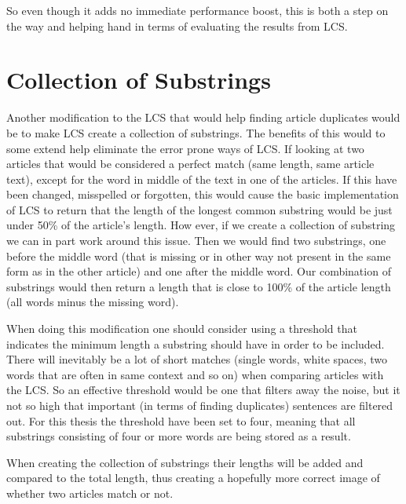 So even though it adds no immediate performance boost, this is both a step on the way and helping hand in terms of evaluating the results from LCS.

\section{Collection of Substrings}
Another modification to the LCS that would help finding article duplicates would be to make LCS create a collection of substrings. The benefits of this would to some extend help eliminate the error prone ways of LCS. If looking at two articles that would be considered a perfect match (same length, same article text), except for the word in middle of the text in one of the articles. If this have been changed, misspelled or forgotten, this would cause the basic implementation of LCS to return that the length of the longest common substring would be just under 50\% of the article's length. How ever, if we create a collection of substring we can in part work around this issue. Then we would find two substrings, one before the middle word (that is missing or in other way not present in the same form as in the other article) and one after the middle word. Our combination of substrings would then return a length that is close to 100\% of the article length (all words minus the missing word).

When doing this modification one should consider using a threshold that indicates the minimum length a substring should have in order to be included. There will inevitably be a lot of short matches (single words, white spaces, two words that are often in same context and so on) when comparing articles with the LCS. So an effective threshold would be one that filters away the noise, but it not so high that important (in terms of finding duplicates) sentences are filtered out. For this thesis the threshold have been set to four, meaning that all substrings consisting of four or more words are being stored as a result.

When creating the collection of substrings their lengths will be added and compared to the total length, thus creating a hopefully more correct image of whether two articles match or not.


